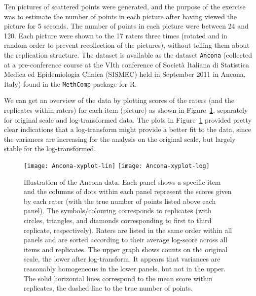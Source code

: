 \documentclass[aoas]{imsart}
\makeatletter
\newcommand{\R}{\textsf{R}\@\xspace}
\newcommand{\pkg}[1]{\texttt{#1}\@\xspace}
\newcommand{\code}[1]{\texttt{#1}\@\xspace}
\makeatother
\begin{document}
% 





Ten pictures of scattered points were generated, and the purpose of
the exercise was to estimate the number of points in each picture
after having viewed the picture for 5 seconds.  The number of points
in each picture were between 24 and 120. Each picture were shown to
the 17 raters three times (rotated and in random order to prevent
recollection of the pictures), without telling them about the
replication structure.  The dataset is available as the dataset
\code{Ancona} (collected at a pre-confe\-rence course at the VIth
conference of Societ\`{a} Italiana di Statistica Medica ed
Epidemiologia Clinica (SISMEC) held in September 2011 in Ancona,
Italy) found in the \pkg{MethComp} package for \R.




We can get an overview of the data by plotting scores of the raters
(and the replicates within raters) for each item (picture) as shown in
Figure~\ref{fig:ancona-data}, separately for original scale and
log-transformed data.  The plots in Figure~\ref{fig:ancona-data}
provided pretty clear indications that a log-transform might provide a
better fit to the data, since the variances are increasing for the
analysis on the original scale, but largely stable for the
log-transformed.

\begin{figure}%
  \centering
\texttt{[image: Ancona-xyplot-lin]}
\texttt{[image: Ancona-xyplot-log]}
\caption{Illustration of the Ancona data. Each panel shows a specific
  item and the columns of dots within each panel represent the scores
  given by each rater (with the true number of points listed above
  each panel). The symbols/colouring corresponds to replicates (with
  circles, triangles, and diamonds corresponding to first to third
  replicate, respectively). Raters are listed in the same order within
  all panels and are sorted according to their average log-score
  across all items and replicates. The upper graph shows counts on the
  original scale, the lower after log-transform. It appears that
  variances are reasonably homogeneous in the lower panels, but not in
  the upper. The solid horizontal lines correspond to the mean score
  within replicates, the dashed line to the true number of points.}
\label{fig:ancona-data}
\end{figure}
\end{document}
